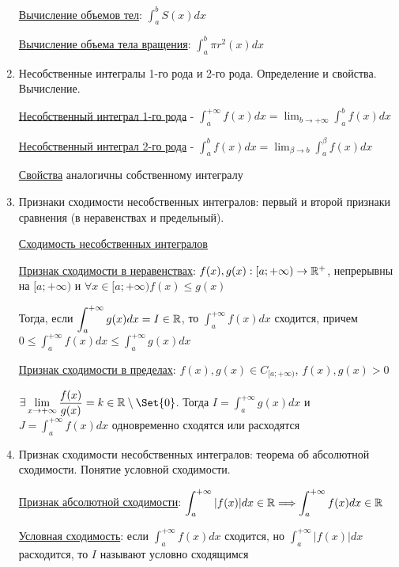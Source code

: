 \documentclass[12pt]{article}
\begin{document}
\begin{enumerate}
        \hyperlink{volumeofbodieswithknownarea}{Вычисление объемов тел}: $\int^b_a S(x)dx$

        \hyperlink{volumeofbodyofrevolution}{Вычисление объема тела вращения}: $\int_a^b \pi r^2(x) dx$


        \item Несобственные интегралы 1-го рода и 2-го рода. Определение и свойства. Вычисление.

        \hyperlink{improperintegralfirstkind}{Несобственный интеграл 1-го рода} - $\int^{+\infty}_{a} f(x) dx = \lim_{b \to +\infty} \int^{b}_{a} f(x) dx$

        \hyperlink{improperintegralsecondkind}{Несобственный интеграл 2-го рода} - $\int^{b}_{a} f(x) dx = \lim_{\beta \to b} \int^{\beta}_{a} f(x) dx$

        \hyperlink{improperintegralproperties}{Свойства} аналогичны собственному интегралу

        \item Признаки сходимости несобственных интегралов: первый и второй признаки сравнения (в неравенствах и предельный).

        \hyperlink{improperintegralconvergence}{Сходимость несобственных интегралов}

        \hyperlink{improperintegralconvergenceininequalities}{Признак сходимости в неравенствах}: $f(x), g(x) : [a;+\infty) \to \mathbb{R}^+$, непрерывны на $[a;+\infty)$ и $\forall x \in [a;+\infty) f(x) \leq g(x)$

        Тогда, если $\displaystyle \int^{+\infty}_{a} g(x) dx = I \in \mathbb{R}$, то $\displaystyle \int^{+\infty}_{a} f(x) dx$ сходится,
        причем $\displaystyle0 \leq \int^{+\infty}_{a} f(x) dx \leq \int^{+\infty}_{a} g(x) dx$

        \hyperlink{improperintegralconvergenceinlimits}{Признак сходимости в пределах}: $f(x), g(x) \in C_{[a;+\infty)}$, $f(x), g(x) > 0$

        $\displaystyle \exists \lim_{x\to+\infty} \frac{f(x)}{g(x)} = k \in \Real \setminus \Set{0}$.
        Тогда $\displaystyle I = \int^{+\infty}_{a} g(x)dx$ и $\displaystyle J = \int^{+\infty}_{a} f(x)dx$ одновременно сходятся или расходятся

        \item Признак сходимости несобственных интегралов: теорема об абсолютной сходимости. Понятие условной сходимости.

        \hyperlink{improperintegralabsoluteconvergence}{Признак абсолютной сходимости}: $\displaystyle \int^{+\infty}_{a} |f(x)| dx \in \mathbb{R} \Longrightarrow \int^{+\infty}_{a} f(x) dx \in \mathbb{R}$

        \hyperlink{improperintegralconditionalconvergence}{Условная сходимость}: если $\displaystyle \int^{+\infty}_{a} f(x) dx$ сходится, но $\displaystyle \int^{+\infty}_{a} |f(x)| dx$ расходится, то $I$ называют условно сходящимся


    \end{enumerate}
\end{document}
